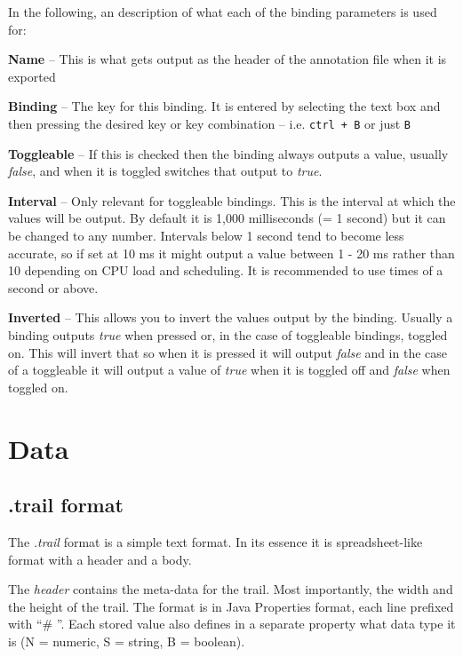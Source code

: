 \documentclass[a4paper]{book}
\begin{document}
In the following, an description of what each of the binding parameters is
used for:
\begin{tight_itemize}
  \item \textbf{Name} -- This is what gets output as the header of the
  annotation file when it is exported
  \item \textbf{Binding} -- The key for this binding. It is entered by
  selecting the text box and then pressing the desired key or key combination
  -- i.e. \texttt{ctrl + B} or just \texttt{B}
  \item \textbf{Toggleable} -- If this is checked then the binding always
  outputs a value, usually \textit{false}, and when it is toggled switches
  that output to \textit{true}.
  \item \textbf{Interval} -- Only relevant for toggleable bindings. This is
  the interval at which the values will be output. By default it is 1,000
  milliseconds (= 1 second) but it can be changed to any number. Intervals
  below 1 second tend to become less accurate, so if set at 10 ms it might
  output a value between 1 - 20 ms rather than 10 depending on CPU load and
  scheduling. It is recommended to use times of a second or above.
  \item \textbf{Inverted} -- This allows you to invert the values output
  by the binding. Usually a binding outputs \textit{true} when pressed or, in the
  case of toggleable bindings, toggled on. This will invert that so when
  it is pressed it will output \textit{false} and in the case of a toggleable it
  will output a value of \textit{true} when it is toggled off and \textit{false} when toggled on.
\end{tight_itemize}


\chapter{Data}
\section{.trail format}
The \textit{.trail} format is a simple text format. In its essence it is
spreadsheet-like format with a header and a body.

The \textit{header} contains the meta-data for the trail. Most importantly,
the width and the height of the trail. The format is in Java Properties format,
each line prefixed with ``\# ''. Each stored value also defines in a separate
property what data type it is (N = numeric, S = string, B = boolean).
\end{document}
